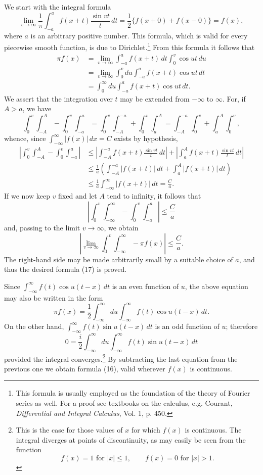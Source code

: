 We start with the integral formula
\[
\lim_{v\to\infty}\frac1\pi\int_{-a}^{a}f(x+t)\frac{\sin vt}{t}\,dt
=\frac12\{f(x+0)+f(x-0)\}=f(x),
\]
where $a$ is an arbitrary positive number. This formula, which is valid for every piecewise smooth function, is due to Dirichlet.\footnote{This formula is usually employed as the foundation of the theory of Fourier series as well. For a proof see textbooks on the calculus, e.g. Courant, \emph{Differential and Integral Calculus}, Vol. 1, p. 450.}
From this formula it follows that
\[
\begin{aligned}
\pi f(x)
&=\lim_{v\to\infty}\int_{-a}^{a}f(x+t)\,dt\int_0^v\cos ut\,du\\
&=\lim_{v\to\infty}\int_0^v du\int_{-a}^{a}f(x+t)\cos ut\,dt\\
&=\int_0^{\infty}du\int_{-a}^{a}f(x+t)\cos ut\,dt.
\end{aligned}
\]
We assert that the integration over $t$ may be extended from $-\infty$ to $\infty$. For, if $A>a$, we have
\[
\int_0^v\int_{-A}^{A}-\int_0^v\int_{-a}^{a}
=\int_0^v\int_{-A}^{-a}+\int_0^v\int_a^A
=\int_{-A}^{-a}\int_0^v+\int_a^A\int_0^v,
\]
whence, since $\int_{-\infty}^{\infty}|f(x)|\,dx=C$ exists by hypothesis,
\[
\begin{aligned}
\left|\int_0^v\int_{-A}^{A}-\int_0^v\int_{-a}^{a}\right|
&\le\left|\int_{-A}^{-a}f(x+t)\frac{\sin vt}{t}\,dt\right|
 +\left|\int_a^A f(x+t)\frac{\sin vt}{t}\,dt\right|\\
&\le\frac1a\left(\int_{-A}^{-a}|f(x+t)|\,dt+\int_a^A|f(x+t)|\,dt\right)\\
&\le\frac1a\int_{-\infty}^{\infty}|f(x+t)|\,dt=\frac Ca.
\end{aligned}
\]
If we now keep $v$ fixed and let $A$ tend to infinity, it follows that
\[
\left|\int_0^v\int_{-\infty}^{\infty}-\int_0^v\int_{-a}^{a}\right|\le\frac Ca
\]
and, passing to the limit $v\to\infty$, we obtain
\[
\left|\lim_{v\to\infty}\int_0^v\int_{-\infty}^{\infty}-\pi f(x)\right|\le\frac Ca.
\]
The right-hand side may be made arbitrarily small by a suitable choice of $a$, and thus the desired formula (17) is proved.

Since $\int_{-\infty}^{\infty}f(t)\cos u(t-x)\,dt$ is an even function of $u$, the above equation may also be written in the form
\[
\pi f(x)=\frac12\int_{-\infty}^{\infty}du
\int_{-\infty}^{\infty}f(t)\cos u(t-x)\,dt.
\]
On the other hand, $\int_{-\infty}^{\infty}f(t)\sin u(t-x)\,dt$ is an odd function of $u$; therefore
\[
0=\frac{i}{2}\int_{-\infty}^{\infty}du
\int_{-\infty}^{\infty}f(t)\sin u(t-x)\,dt
\]
provided the integral converges.\footnote{This is the case for those values of $x$ for which $f(x)$ is continuous. The integral diverges at points of discontinuity, as may easily be seen from the function
\[
f(x)=1\text{ for }|x|\le1,\qquad f(x)=0\text{ for }|x|>1.
\]}
By subtracting the last equation from the previous one we obtain formula (16), valid wherever $f(x)$ is continuous.

